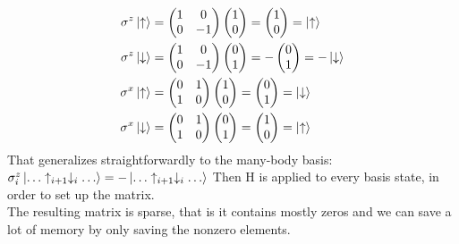 \documentclass{article}
\begin{document}
\begin{align*}
\sigma^z \ket{\uparrow} &= 
\begin{pmatrix}
1 & 0\\
0 & -1
\end{pmatrix}
\begin{pmatrix}
1\\
0
\end{pmatrix} = 
\begin{pmatrix}
1\\
0
\end{pmatrix} = \ket{\uparrow}
\\
\sigma^z \ket{\downarrow} &= 
\begin{pmatrix}
1 & 0\\
0 & -1
\end{pmatrix}
\begin{pmatrix}
0\\
1
\end{pmatrix} = -
\begin{pmatrix}
0\\
1
\end{pmatrix} = -\ket{\downarrow}
\\
\sigma^x \ket{\uparrow} &= 
\begin{pmatrix}
0 & 1\\
1 & 0
\end{pmatrix}
\begin{pmatrix}
1\\
0
\end{pmatrix} = 
\begin{pmatrix}
0\\
1
\end{pmatrix} = \ket{\downarrow}
\\
\sigma^x \ket{\downarrow} &= 
\begin{pmatrix}
0 & 1\\
1 & 0
\end{pmatrix}
\begin{pmatrix}
0\\
1
\end{pmatrix} =
\begin{pmatrix}
1\\
0
\end{pmatrix} = \ket{\uparrow}
\end{align*}
That generalizes straightforwardly to the many-body basis: $\sigma_i^z
\ket{\dotso \uparrow_{i+1} \downarrow_i \dotso} = - \ket{\dotso \uparrow_{i+1} \downarrow_i\dotso} $ Then H is applied to every basis state, in order to set up the matrix.\\The resulting matrix is sparse, that is it contains mostly zeros and we can save a lot of memory by only saving the nonzero elements.\\
\end{document}
